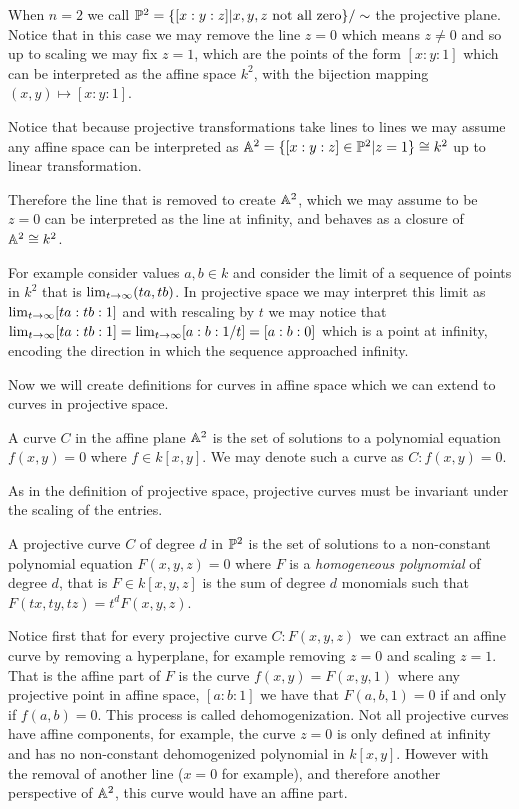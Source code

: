 \begin{example}
    When $n=2$ we call $\P^2=\{[x:y:z]|x,y,z\text{ not all zero}\}/\sim$ the projective plane. Notice that in this case we may remove the line $z=0$ which means $z\neq 0$ and so up to scaling we may fix $z=1$, which are the points of the form $[x:y:1]$ which can be interpreted as the affine space $k^2$, with the bijection mapping $(x,y)\mapsto [x:y:1]$. 
\end{example}
 Notice that because projective transformations take lines to lines we may assume any affine space can be interpreted as $\A^2=\{[x:y:z]\in \P^2|z=1\}\cong k^2$ up to linear transformation. 
  
  Therefore the line that is removed to create $\A^2$, which we may assume to be $z=0$ can be interpreted as the line at infinity, and behaves as a closure of $\A^2\cong k^2$.

For example consider values $a, b\in k$ and consider the limit of a sequence of points in $k^2$ that is $\lim_{t\ra\infty}(ta,tb)$. In projective space we may interpret this limit as $\lim_{t\ra\infty}[ta:tb:1]$ and with rescaling by $t$ we may notice that $\lim_{t\ra\infty}[ta:tb:1]=\lim_{t\ra\infty}[a:b:1/t]=[a:b:0]$ which is a point at infinity, encoding the direction in which the sequence approached infinity.

Now we will create definitions for curves in affine space which we can extend to curves in projective space. 

\begin{definition}
    A curve $C$ in the affine plane $\A^2$ is the set of solutions to a polynomial equation $f(x,y)=0$ where $f\in k[x,y]$. We may denote such a curve as $C:f(x,y)=0$.
\end{definition}
As in the definition of projective space, projective curves must be invariant under the scaling of the entries. 
\begin{definition}
    A projective curve $C$ of degree $d$ in $\P^2$ is the set of solutions to a non-constant polynomial equation $F(x,y,z)=0$ where $F$ is a \textit{homogeneous polynomial} of degree $d$, that is $F\in k[x,y,z]$ is the sum of degree $d$ monomials such that $F(tx,ty,tz)=t^dF(x,y,z)$.
\end{definition}
Notice first that for every projective curve $C:F(x,y,z)$ we can extract an affine curve by removing a hyperplane, for example removing $z=0$ and scaling $z=1$. That is the affine part of $F$ is the curve $f(x,y)=F(x,y,1)$ where any projective point in affine space, $[a:b:1]$ we have that $F(a,b,1)=0$ if and only if $f(a,b)=0$. This process is called dehomogenization. Not all projective curves have affine components, for example, the curve $z=0$ is only defined at infinity and has no non-constant dehomogenized polynomial in $k[x,y]$. However with the removal of another line ($x=0$ for example), and therefore another perspective of $\A^2$, this curve would have an affine part. 

